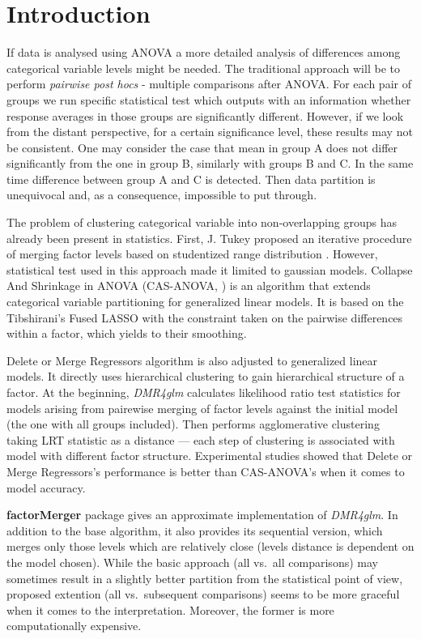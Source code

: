 \documentclass[11pt,]{article}
\begin{document}
\vskip 6.5pt

\noindent  \section{Introduction}\label{introduction}

If data is analysed using ANOVA a more detailed analysis of differences
among categorical variable levels might be needed. The traditional
approach will be to perform \emph{pairwise post hocs} - multiple
comparisons after ANOVA. For each pair of groups we run specific
statistical test which outputs with an information whether response
averages in those groups are significantly different. However, if we
look from the distant perspective, for a certain significance level,
these results may not be consistent. One may consider the case that mean
in group A does not differ significantly from the one in group B,
similarly with groups B and C. In the same time difference between group
A and C is detected. Then data partition is unequivocal and, as a
consequence, impossible to put through.

The problem of clustering categorical variable into non-overlapping
groups has already been present in statistics. First, J. Tukey proposed
an iterative procedure of merging factor levels based on studentized
range distribution \citep{Tukey}. However, statistical test used in this
approach made it limited to gaussian models. Collapse And Shrinkage in
ANOVA (CAS-ANOVA, \citet{Casanova}) is an algorithm that extends
categorical variable partitioning for generalized linear models. It is
based on the Tibshirani's Fused LASSO \citep{Tib} with the constraint
taken on the pairwise differences within a factor, which yields to their
smoothing.

Delete or Merge Regressors algorithm \citep{Proch} is also adjusted to
generalized linear models. It directly uses hierarchical clustering to
gain hierarchical structure of a factor. At the beginning,
\emph{DMR4glm} calculates likelihood ratio test statistics for models
arising from pairewise merging of factor levels against the initial
model (the one with all groups included). Then performs agglomerative
clustering taking LRT statistic as a distance --- each step of
clustering is associated with model with different factor structure.
Experimental studies \citep{ProchEx} showed that Delete or Merge
Regressors's performance is better than CAS-ANOVA's when it comes to
model accuracy.

\textbf{factorMerger} package gives an approximate implementation of
\emph{DMR4glm}. In addition to the base algorithm, it also provides its
sequential version, which merges only those levels which are relatively
close (levels distance is dependent on the model chosen). While the
basic approach (all vs.~all comparisons) may sometimes result in a
slightly better partition from the statistical point of view, proposed
extention (all vs.~subsequent comparisons) seems to be more graceful
when it comes to the interpretation. Moreover, the former is more
computationally expensive.
\end{document}
